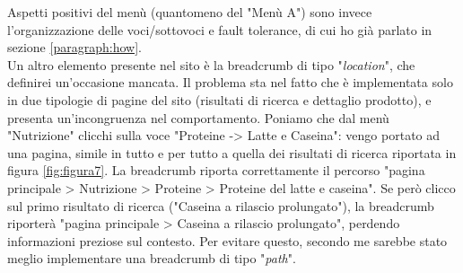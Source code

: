 Aspetti positivi del menù (quantomeno del "Menù A") sono invece l'organizzazione delle voci/sottovoci e fault tolerance, di cui ho già parlato in sezione \ref{paragraph:how}.\\
Un altro elemento presente nel sito è la breadcrumb di tipo "\textit{location}", che definirei un'occasione mancata. Il problema sta nel fatto che è implementata solo in due tipologie di pagine del sito (risultati di ricerca e dettaglio prodotto), e presenta un'incongruenza nel comportamento. Poniamo che dal menù "Nutrizione" clicchi sulla voce "Proteine -> Latte e Caseina": vengo portato ad una pagina, simile in tutto e per tutto a quella dei risultati di ricerca riportata in figura \ref{fig:figura7}. La breadcrumb riporta correttamente il percorso "pagina principale > Nutrizione > Proteine > Proteine del latte e caseina". Se però clicco sul primo risultato di ricerca ("Caseina a rilascio prolungato"), la breadcrumb riporterà "pagina principale > Caseina a rilascio prolungato", perdendo informazioni preziose sul contesto. Per evitare questo, secondo me sarebbe stato meglio implementare una breadcrumb di tipo "\textit{path}".